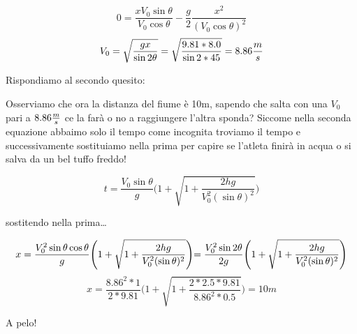 \begin{equation*}
    0 = \frac{xV_0\sin{\theta}}{V_0\cos{\theta}}-\frac{g}{2}\frac{x^2}{(V_0\cos{\theta})^2}
\end{equation*}
\begin{equation*}
    V_0 = \sqrt{\frac{gx}{\sin{2\theta}}} = \sqrt{\frac{9.81*8.0}{\sin{2*45}}} = 8.86\frac{m}{s}
\end{equation*}

Rispondiamo al secondo quesito: 

Osserviamo che ora la distanza del fiume è 10m, sapendo che salta con una  $V_0$ pari a $8.86\frac{m}{s}$ ce la farà o no a raggiungere l'altra sponda?
Siccome nella seconda equazione abbaimo solo il tempo come incognita troviamo il tempo e successivamente sostituiamo nella prima per capire se l'atleta finirà in acqua o si salva da un bel tuffo freddo!


\begin{equation*}
    t = \frac{V_0\sin{\theta}}{g}\Biggl(1+\sqrt{1+\frac{2hg}{V_0^2(\sin{\theta})^2}}\Biggl)
\end{equation*}

sostitendo nella prima\dots


\begin{equation*}
    x = \frac{V_0^2\sin{\theta}\cos{\theta}}{g}\Biggr(1+\sqrt{1+\frac{2hg}{V_0^2(\sin{\theta})^2}}\Biggl) = \frac{V_0^2\sin{2\theta}}{2g}\Biggr(1+\sqrt{1+\frac{2hg}{V_0^2(\sin{\theta})^2}}\Biggl)
\end{equation*}
\begin{equation*}
    x = \frac{8.86^2*1}{2*9.81}\Biggr(1+\sqrt{1+\frac{2*2.5*9.81}{8.86^2*0.5}}\Biggl)= 10m
\end{equation*}

A pelo!

